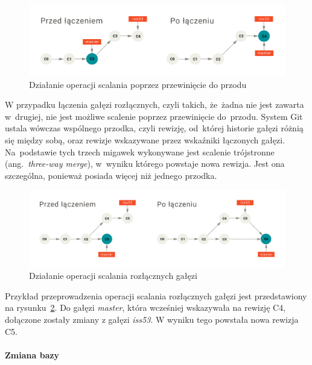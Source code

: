 \documentclass[12pt,a4paper,polish,thesis]{dcsbook}
\begin{document}
	\begin{figure}[h]
		\centering
		\includegraphics[width=14cm]{git-merge_ff}
		\caption{Działanie operacji scalania poprzez przewinięcie do przodu}
		\label{fig:git-merge_ff}
	\end{figure}

	W przypadku łączenia gałęzi rozłącznych, czyli takich, że~żadna nie jest zawarta w~drugiej, nie jest możliwe scalenie poprzez przewinięcie do~przodu. System Git ustala wówczas wspólnego przodka, czyli rewizję, od~której historie gałęzi różnią się między sobą, oraz rewizje wskazywane przez wskaźniki łączonych gałęzi. Na~podstawie tych trzech migawek wykonywane jest scalenie trójstronne (ang.~\textit{three-way merge}), w~wyniku którego powstaje nowa rewizja. Jest ona szczególna, ponieważ posiada więcej niż jednego przodka.

	\begin{figure}[h]
		\centering
		\includegraphics[width=15cm]{git-merge_no_ff}
		\caption{Działanie operacji scalania rozłącznych gałęzi}
		\label{fig:git-merge_no_ff}
	\end{figure}

	Przykład przeprowadzenia operacji scalania rozłącznych gałęzi jest przedstawiony na rysunku~\ref{fig:git-merge_no_ff}. Do gałęzi \textit{master}, która wcześniej wskazywała na rewizję C4, dołączone zostały zmiany z gałęzi \textit{iss53}. W wyniku tego powstała nowa rewizja C5.

	\FloatBarrier

	\paragraph{Zmiana bazy}
\end{document}
